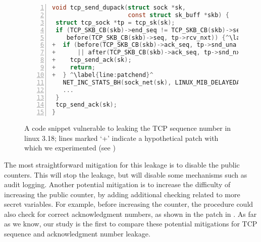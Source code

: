 \lstset{escapechar=@,style=customc}
\begin{figure}\centering
\begin{minipage}[b]{0.9\linewidth}
\centering
{
\lstset{escapechar=@,style=customc}
 \begin{lstlisting}[language=c,numbers=left,escapechar=^,numberstyle=\small, numbersep=4pt, ] 
void tcp_send_dupack(struct sock *sk,
                     const struct sk_buff *skb) {
 struct tcp_sock *tp = tcp_sk(sk);
 if (TCP_SKB_CB(skb)->end_seq != TCP_SKB_CB(skb)->seq &&
    before(TCP_SKB_CB(skb)->seq, tp->rcv_nxt)) {^\label{line:leak}^
+  if (before(TCP_SKB_CB(skb)->ack_seq, tp->snd_una - tp->max_window) ^\label{line:patchstart}^
+      || after(TCP_SKB_CB(skb)->ack_seq, tp->snd_nxt)) { 
+    tcp_send_ack(sk);
+    return;
+  } ^\label{line:patchend}^
   NET_INC_STATS_BH(sock_net(sk), LINUX_MIB_DELAYEDACKLOST);^\label{line:signalend}^
   ...
 }
 tcp_send_ack(sk);
}
\end{lstlisting}
}
\end{minipage}
\caption[A code snippet for Linux TCP implementation]{A code snippet vulnerable to leaking the TCP sequence number
  in linux 3.18; lines marked `+' indicate a hypothetical patch with
  which we experimented (see )}
\label{fig:leak}
\end{figure}

The most straightforward mitigation for this leakage is to disable the
public counters.  This will stop the leakage, but will disable some
mechanisms such as audit logging.  Another potential mitigation is to
increase the difficulty of increasing the public counter, by adding
additional checking related to more secret variables. For example,
before increasing the \linuxmibdelayedacklost counter, the procedure
could also check for correct acknowledgment numbers, as shown in the patch in
. As far as we know, our
study is the first to compare these potential
mitigations for TCP sequence and acknowledgment number leakage.

